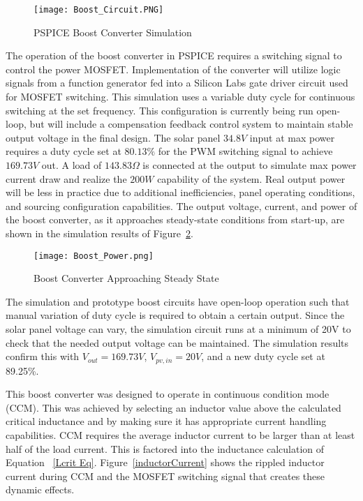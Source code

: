 \begin{figure}
\centering
\texttt{[image: Boost\_Circuit.PNG]}
\caption{PSPICE Boost Converter Simulation}
\label{boostCrct}
\end{figure}

The operation of the boost converter in PSPICE requires a switching signal to control the power MOSFET. Implementation of the converter will utilize logic signals from a function generator fed into a Silicon Labs gate driver circuit used for MOSFET switching. This simulation uses a variable duty cycle for continuous switching at the set frequency. This configuration is currently being run open-loop, but will include a compensation feedback control system to maintain stable output voltage in the final design. The solar panel $34.8V$ input at max power requires a duty cycle set at $80.13\%$ for the PWM switching signal to achieve $169.73V$ out. A load of $143.83\Omega$ is connected at the output to simulate max power current draw and realize the $200W$ capability of the system. Real output power will be less in practice due to additional inefficiencies, panel operating conditions, and sourcing configuration capabilities. The output voltage, current, and power of the boost converter, as it approaches steady-state conditions from start-up, are shown in the simulation results of Figure~\ref{boostApproachSteady}. 

\begin{figure}
\centering
\texttt{[image: Boost\_Power.png]}
\caption{Boost Converter Approaching Steady State}
\label{boostApproachSteady}
\end{figure}

The simulation and prototype boost circuits have open-loop operation such that manual variation of duty cycle is required to obtain a certain output. Since the solar panel voltage can vary, the simulation circuit runs at a minimum of 20V to check that the needed output voltage can be maintained. The simulation results confirm this with $V_{out}=169.73V$, $V_{pv,in}=20V$, and a new duty cycle set at 89.25\%. 

This boost converter was designed to operate in continuous condition mode (CCM). This was achieved by selecting an inductor value above the calculated critical inductance and by making sure it has appropriate current handling capabilities. CCM requires the average inductor current to be larger than at least half of the load current. This is factored into the inductance calculation of Equation ~\ref{Lcrit Eq}.  Figure~\ref{inductorCurrent} shows the rippled inductor current during CCM and the MOSFET switching signal that creates these dynamic effects. 

